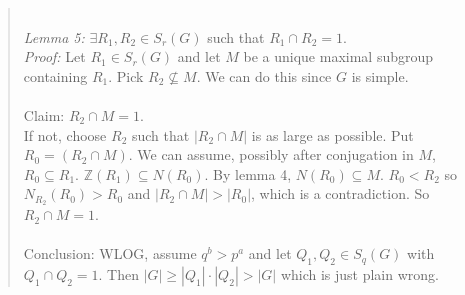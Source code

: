 \begin{quote}
\\
\emph {Lemma 5:}  $\exists R_1, R_2 \in S_r(G)$ such that $R_1 \cap R_2 = 1$.
\\
\emph{Proof:}  Let $R_1 \in S_r(G)$ and let $M$ be a unique maximal subgroup containing
$R_1$.  Pick $R_2 \nsubseteq M$.  We can do this since $G$ is simple.\\
\\
Claim: $R_2 \cap M=1$.
\\
If not, choose $R_2$ such that $|R_2 \cap M|$ is as large as possible.  Put
$R_0 = (R_2 \cap M)$.
We can assume, possibly after conjugation in $M$, $R_0 \subseteq R_1$.  ${\mathbb Z}(R_1) \subseteq N(R_0)$.
By lemma 4, $N(R_0) \subseteq M$.  $R_0 < R_2$ so $N_{R_2}(R_0) > R_0$ and $|R_2 \cap M| > |R_0|$,
which is a contradiction.  So $R_2 \cap M=1$.
\\
\\
Conclusion: WLOG, assume $q^b > p^a$ and let $Q_1, Q_2 \in S_q(G)$ with $Q_1 \cap Q_2=1$.
Then $|G| \ge |Q_1| \cdot |Q_2| > |G|$ which is just plain wrong.
\end{quote}
